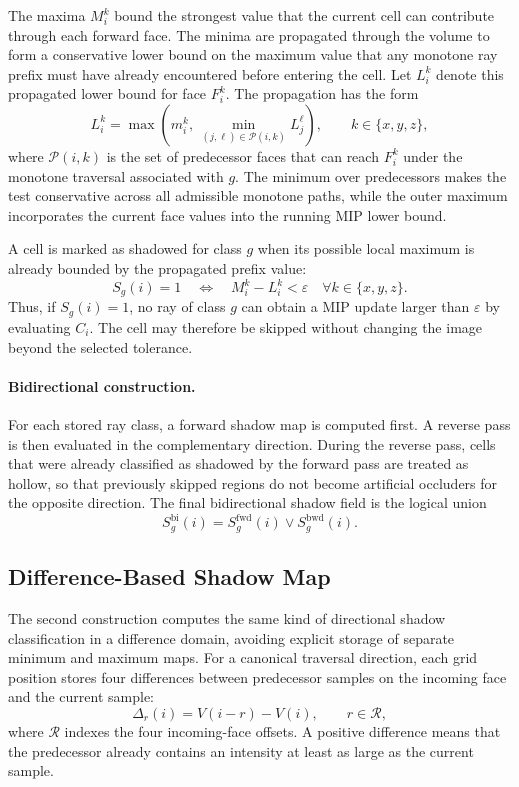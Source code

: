 The maxima \(M_i^k\) bound the strongest value that the current cell can
contribute through each forward face.  The minima are propagated through the
volume to form a conservative lower bound on the maximum value that any
monotone ray prefix must have already encountered before entering the cell.
Let \(L_i^k\) denote this propagated lower bound for face \(F_i^k\).  The
propagation has the form
\[
    L_i^k =
    \max\left(
        m_i^k,\,
        \min_{(j,\ell)\in\mathcal{P}(i,k)} L_j^\ell
    \right),
    \qquad k\in\{x,y,z\},
\]
where \(\mathcal{P}(i,k)\) is the set of predecessor faces that can reach
\(F_i^k\) under the monotone traversal associated with \(g\).  The minimum over
predecessors makes the test conservative across all admissible monotone paths,
while the outer maximum incorporates the current face values into the running
MIP lower bound.

A cell is marked as shadowed for class \(g\) when its possible local maximum is
already bounded by the propagated prefix value:
\[
    S_g(i)=1
    \quad\Longleftrightarrow\quad
    M_i^k - L_i^k < \varepsilon
    \quad\forall k\in\{x,y,z\}.
\]
Thus, if \(S_g(i)=1\), no ray of class \(g\) can obtain a MIP update larger
than \(\varepsilon\) by evaluating \(C_i\).  The cell may therefore be skipped
without changing the image beyond the selected tolerance.

\paragraph{Bidirectional construction.}
For each stored ray class, a forward shadow map is computed first.  A reverse
pass is then evaluated in the complementary direction.  During the reverse
pass, cells that were already classified as shadowed by the forward pass are
treated as hollow, so that previously skipped regions do not become artificial
occluders for the opposite direction.  The final bidirectional shadow field is
the logical union
\[
    S_g^{\mathrm{bi}}(i)
    =
    S_g^{\mathrm{fwd}}(i)
    \lor
    S_g^{\mathrm{bwd}}(i).
\]

\subsection{Difference-Based Shadow Map}
\label{subsec:difference-shadow-map}

The second construction computes the same kind of directional shadow
classification in a difference domain, avoiding explicit storage of separate
minimum and maximum maps.  For a canonical traversal direction, each grid
position stores four differences between predecessor samples on the incoming
face and the current sample:
\[
    \Delta_r(i) = V(i-r)-V(i),
    \qquad r\in\mathcal{R},
\]
where \(\mathcal{R}\) indexes the four incoming-face offsets.  A positive
difference means that the predecessor already contains an intensity at least
as large as the current sample.

